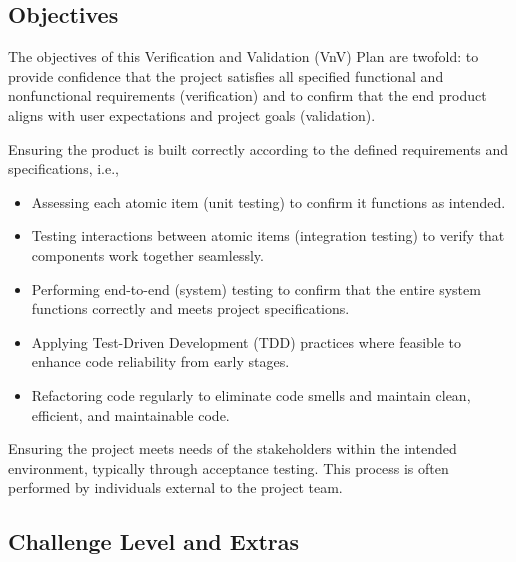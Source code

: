 \documentclass[12pt, titlepage]{article}
\begin{document}
  \subsection{Objectives}

  The objectives of this Verification and Validation (VnV) Plan are twofold: to provide confidence that the project satisfies all specified functional and nonfunctional requirements (verification) and to confirm that the end product aligns with user expectations and project goals (validation).
  
\begin{description}[leftmargin=0cm]
  \item[Verification] Ensuring the product is built correctly according to the defined requirements and specifications, i.e.,
  \begin{itemize}
    \item Assessing each atomic item (unit testing) to confirm it functions as intended.
    \item Testing interactions between atomic items (integration testing) to verify that components work together seamlessly.
    \item Performing end-to-end (system) testing to confirm that the entire system functions correctly and meets project specifications.
    \item Applying Test-Driven Development (TDD) practices where feasible to enhance code reliability from early stages.
    \item Refactoring code regularly to eliminate code smells and maintain clean, efficient, and maintainable code.
  \end{itemize}
  \item[Validation] Ensuring the project meets needs of the stakeholders within the intended environment, typically through acceptance testing. This process is often performed by individuals external to the project team.
\end{description}

\subsection{Challenge Level and Extras}
\end{document}
